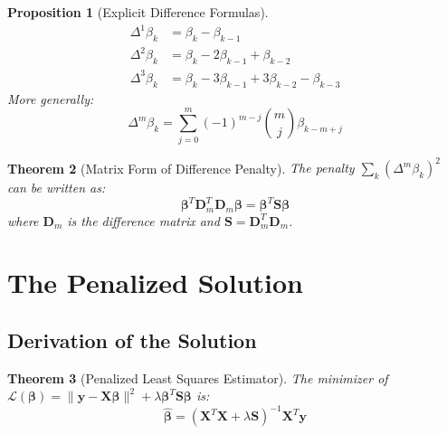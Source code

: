 \documentclass[12pt]{article}
\newtheorem{theorem}{Theorem}
\newtheorem{proposition}[theorem]{Proposition}
\begin{document}
\begin{proposition}[Explicit Difference Formulas]
\begin{align}
\Delta^1 \beta_k &= \beta_k - \beta_{k-1} \\
\Delta^2 \beta_k &= \beta_k - 2\beta_{k-1} + \beta_{k-2} \\
\Delta^3 \beta_k &= \beta_k - 3\beta_{k-1} + 3\beta_{k-2} - \beta_{k-3}
\end{align}
More generally:
\begin{equation}
\Delta^m \beta_k = \sum_{j=0}^m (-1)^{m-j} \binom{m}{j} \beta_{k-m+j}
\end{equation}
\end{proposition}

\begin{theorem}[Matrix Form of Difference Penalty]
The penalty $\sum_k (\Delta^m \beta_k)^2$ can be written as:
\begin{equation}
\bm{\beta}^T \mathbf{D}_m^T \mathbf{D}_m \bm{\beta} = \bm{\beta}^T \mathbf{S} \bm{\beta}
\end{equation}
where $\mathbf{D}_m$ is the difference matrix and $\mathbf{S} = \mathbf{D}_m^T \mathbf{D}_m$.
\end{theorem}

\section{The Penalized Solution}

\subsection{Derivation of the Solution}

\begin{theorem}[Penalized Least Squares Estimator]
The minimizer of $\mathcal{L}(\bm{\beta}) = \|\mathbf{y} - \mathbf{X}\bm{\beta}\|^2 + \lambda \bm{\beta}^T \mathbf{S} \bm{\beta}$ is:
\begin{equation}
\hat{\bm{\beta}} = (\mathbf{X}^T\mathbf{X} + \lambda\mathbf{S})^{-1}\mathbf{X}^T\mathbf{y}
\end{equation}
\end{theorem}
\end{document}
